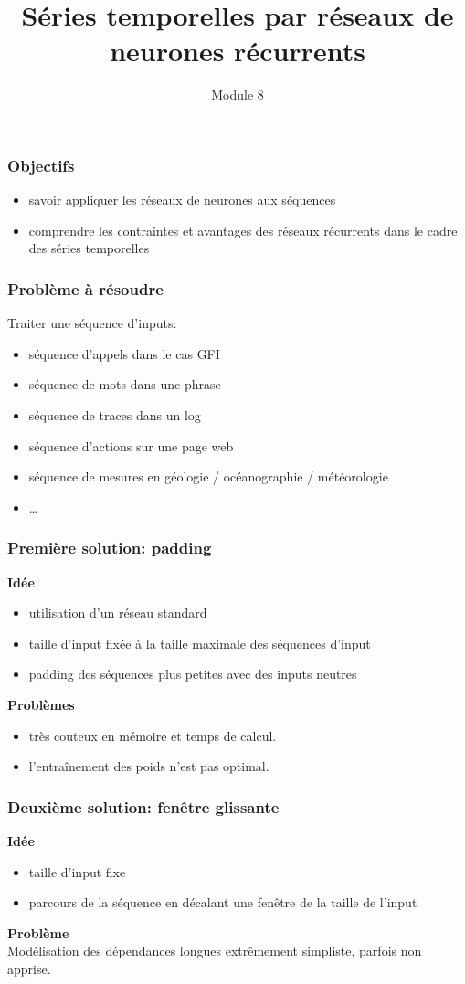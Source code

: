 \documentclass{formation}
\title{Séries temporelles par réseaux de neurones récurrents}
\subtitle{Module 8}
\begin{document}
\maketitle

\begin{frame}
  \frametitle{Objectifs}
  \begin{itemize}
  \item savoir appliquer les réseaux de neurones aux séquences
  \item comprendre les contraintes et avantages des réseaux récurrents
    dans le cadre des séries temporelles
  \end{itemize}
\end{frame}

\begin{frame}
  \frametitle{Problème à résoudre}
  Traiter une séquence d'inputs:
  \begin{itemize}
  \item séquence d'appels dans le cas GFI
  \item séquence de mots dans une phrase
  \item séquence de traces dans un log
  \item séquence d'actions sur une page web
  \item séquence de mesures en géologie / océanographie / météorologie
  \item …
  \end{itemize}
\end{frame}

\begin{frame}
  \frametitle{Première solution: padding}
  \textbf{Idée}
  \begin{itemize}
  \item utilisation d'un réseau standard
  \item taille d'input fixée à la taille maximale des séquences d'input
  \item padding des séquences plus petites avec des inputs neutres
  \end{itemize}
  \textbf{Problèmes}
  \begin{itemize}
  \item très couteux en mémoire et temps de calcul.
  \item l'entraînement des poids n'est pas optimal. \pause
  \end{itemize}
\end{frame}

\begin{frame}
  \frametitle{Deuxième solution: fenêtre glissante}
  \textbf{Idée}
  \begin{itemize}
  \item taille d'input fixe
  \item parcours de la séquence en décalant une fenêtre de la taille
    de l'input
  \end{itemize}
  
  \textbf{Problème}\\[.2cm]
  Modélisation des dépendances longues extrêmement simpliste, parfois
  non apprise. \pause {}
\end{frame}
\end{document}
